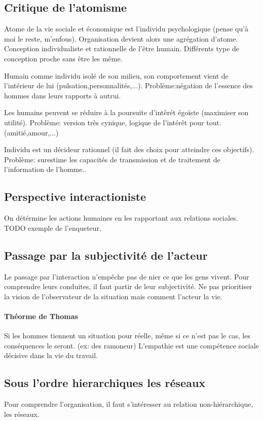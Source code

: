 \documentclass[11pt]{article} %
\begin{document}
	\subsection{Critique de l'atomisme}
		Atome de la vie sociale et économique est l'individu psychologique (pense qu'à moi le reste, 
		m'enfous). 
		Organisation devient alors une agrégation d'atome. Conception individualiste et rationnelle de l'être 
		humain. Différents type de conception proche sans être les même.
		\begin{description}
			\item [Conception monadique:] Humain comme individu isolé de son milieu, son comportement 
			vient de l'intérieur de lui (pulsation,personnalités,...). Problème:négation de l'essence des hommes
			dans leurs rapports à autrui.
			\item[Utilitarisme:] Les humains peuvent se réduire à la poursuite d'intêrét égoïste (maximiser son 
			utilité). Problème: version très cynique, logique de l'intérêt pour tout.(amitié,amour,...)
			\item Individu est un décideur rationnel (il fait des choix pour atteindre ces objectifs). Problème:
			surestime les capacités de transmission et de traitement de l'information de l'homme..
		\end{description}
	\subsection{Perspective interactioniste}
		On détérmine les actions humaines en les rapportant aux relations sociales. TODO exemple de 
		l'enqueteur.
	\subsection{Passage par la subjectivité de l'acteur}
		Le passage par l'interaction n'empêche pas de nier ce que les gens vivent. Pour comprendre leurs 
		conduites, il faut partir de leur subjectivité. Ne pas prioritiser la vision de l'observateur de la situation
		mais comment l'acteur la vie.
		\paragraph{Théorme de Thomas} Si les hommes tiennent un situation pour réelle, même si ce n'est
		pas le cas, les conséquences le seront.  (ex: des ramoneur)
		L'empathie est une compétence sociale décisive dans la vie du travail.
	\subsection{Sous l'ordre hierarchiques les réseaux}
		Pour comprendre l'organisation, il faut s'intéresser au relation non-hiérarchique, les réseaux.
\end{document}
